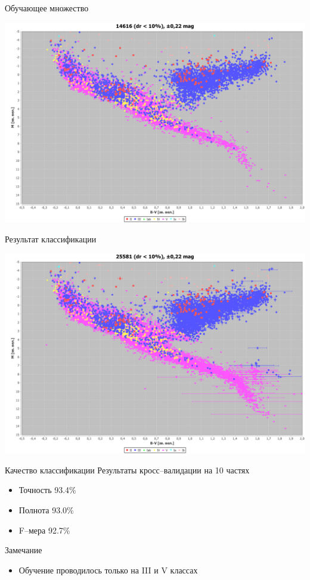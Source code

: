 \documentclass[14pt, fleqn, xcolor={dvipsnames, table}]{beamer}
\begin{document}
        \begin{frame}{Обучающее множество}
            \begin{center}
                \includegraphics[scale=0.25]{ml-1.png}
            \end{center}             
        \end{frame}
        
        \begin{frame}{Результат классификации}
            \begin{center}
                \includegraphics[scale=0.25]{ml-2.png}
            \end{center}             
        \end{frame}
        
        \begin{frame}{Качество классификации}
            Результаты кросс--валидации на 10 частях
            \begin{itemize}
                \item Точность 93.4\%
                \item Полнота 93.0\%
                \item F--мера 92.7\%
            \end{itemize}
            Замечание
            \begin{itemize}
                \item Обучение проводилось только на III и V классах
            \end{itemize}
        \end{frame}    
\end{document}
